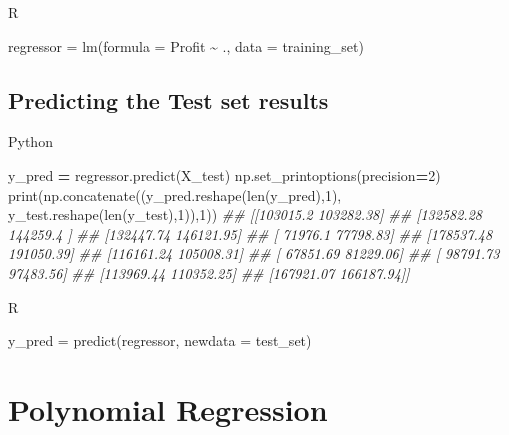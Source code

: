 \documentclass[
]{book}
\newenvironment{Shaded}{\begin{snugshade}}{\end{snugshade}}
\newcommand{\AttributeTok}[1]{\textcolor[rgb]{0.77,0.63,0.00}{#1}}
\newcommand{\BuiltInTok}[1]{#1}
\newcommand{\CommentTok}[1]{\textcolor[rgb]{0.56,0.35,0.01}{\textit{#1}}}
\newcommand{\DecValTok}[1]{\textcolor[rgb]{0.00,0.00,0.81}{#1}}
\newcommand{\FunctionTok}[1]{\textcolor[rgb]{0.00,0.00,0.00}{#1}}
\newcommand{\NormalTok}[1]{#1}
\newcommand{\OperatorTok}[1]{\textcolor[rgb]{0.81,0.36,0.00}{\textbf{#1}}}
\newcommand{\OtherTok}[1]{\textcolor[rgb]{0.56,0.35,0.01}{#1}}
\newcommand{\SpecialCharTok}[1]{\textcolor[rgb]{0.00,0.00,0.00}{#1}}
\theoremstyle{definition}
\theoremstyle{definition}
\theoremstyle{definition}
\theoremstyle{definition}
\theoremstyle{remark}
\begin{document}
R

\begin{Shaded}
\begin{Highlighting}[]
\NormalTok{regressor }\OtherTok{=} \FunctionTok{lm}\NormalTok{(}\AttributeTok{formula =}\NormalTok{ Profit }\SpecialCharTok{\textasciitilde{}}\NormalTok{ .,}
               \AttributeTok{data =}\NormalTok{ training\_set)}
\end{Highlighting}
\end{Shaded}

\hypertarget{predicting-the-test-set-results-1}{%
\subsection{Predicting the Test set results}\label{predicting-the-test-set-results-1}}

Python

\begin{Shaded}
\begin{Highlighting}[]
\NormalTok{y\_pred }\OperatorTok{=}\NormalTok{ regressor.predict(X\_test)}
\NormalTok{np.set\_printoptions(precision}\OperatorTok{=}\DecValTok{2}\NormalTok{)}
\BuiltInTok{print}\NormalTok{(np.concatenate((y\_pred.reshape(}\BuiltInTok{len}\NormalTok{(y\_pred),}\DecValTok{1}\NormalTok{), y\_test.reshape(}\BuiltInTok{len}\NormalTok{(y\_test),}\DecValTok{1}\NormalTok{)),}\DecValTok{1}\NormalTok{))}
\CommentTok{\#\# [[103015.2  103282.38]}
\CommentTok{\#\#  [132582.28 144259.4 ]}
\CommentTok{\#\#  [132447.74 146121.95]}
\CommentTok{\#\#  [ 71976.1   77798.83]}
\CommentTok{\#\#  [178537.48 191050.39]}
\CommentTok{\#\#  [116161.24 105008.31]}
\CommentTok{\#\#  [ 67851.69  81229.06]}
\CommentTok{\#\#  [ 98791.73  97483.56]}
\CommentTok{\#\#  [113969.44 110352.25]}
\CommentTok{\#\#  [167921.07 166187.94]]}
\end{Highlighting}
\end{Shaded}

R

\begin{Shaded}
\begin{Highlighting}[]
\NormalTok{y\_pred }\OtherTok{=} \FunctionTok{predict}\NormalTok{(regressor, }\AttributeTok{newdata =}\NormalTok{ test\_set)}
\end{Highlighting}
\end{Shaded}

\hypertarget{polynomial-regression}{%
\section{Polynomial Regression}\label{polynomial-regression}}
\end{document}
